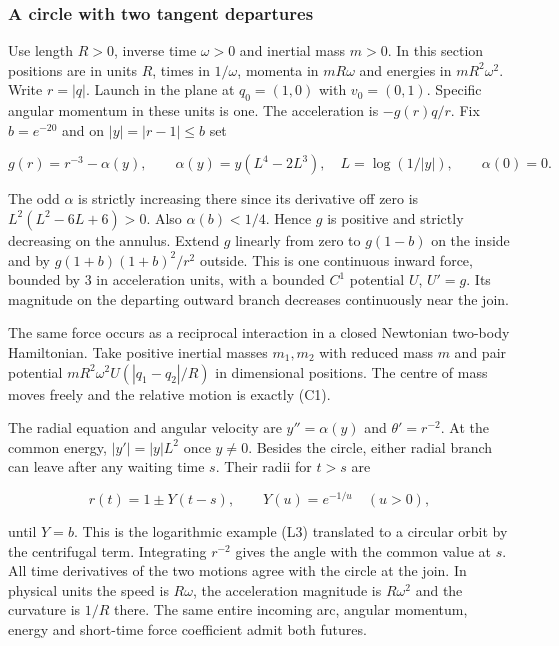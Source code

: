 \documentclass[11pt,a4paper]{article}
\begin{document}
\subsubsection{A circle with two tangent
departures}\label{a-circle-with-two-tangent-departures}

Use length \(R>0\), inverse time \(\omega>0\) and inertial mass \(m>0\).
In this section positions are in units \(R\), times in \(1/\omega\),
momenta in \(mR\omega\) and energies in \(mR^2\omega^2\). Write
\(r=|q|\). Launch in the plane at \(q_0=(1,0)\) with \(v_0=(0,1)\).
Specific angular momentum in these units is one. The acceleration is
\(-g(r)q/r\). Fix \(b=e^{-20}\) and on \(|y|=|r-1|\le b\) set

\[
 g(r)=r^{-3}-\alpha(y),\qquad
 \alpha(y)=y(L^4-2L^3),\quad L=\log(1/|y|),\qquad \alpha(0)=0. \tag{C1}
\]

The odd \(\alpha\) is strictly increasing there since its derivative off
zero is \(L^2(L^2-6L+6)>0\). Also \(\alpha(b)<1/4\). Hence \(g\) is
positive and strictly decreasing on the annulus. Extend \(g\) linearly
from zero to \(g(1-b)\) on the inside and by \(g(1+b)(1+b)^2/r^2\)
outside. This is one continuous inward force, bounded by \(3\) in
acceleration units, with a bounded \(C^1\) potential \(U\), \(U'=g\).
Its magnitude on the departing outward branch decreases continuously
near the join.

The same force occurs as a reciprocal interaction in a closed Newtonian
two-body Hamiltonian. Take positive inertial masses \(m_1,m_2\) with
reduced mass \(m\) and pair potential \(mR^2\omega^2 U(|q_1-q_2|/R)\) in
dimensional positions. The centre of mass moves freely and the relative
motion is exactly (C1).

The radial equation and angular velocity are \(y''=\alpha(y)\) and
\(\theta'=r^{-2}\). At the common energy, \(|y'|=|y|L^2\) once
\(y\ne0\). Besides the circle, either radial branch can leave after any
waiting time \(s\). Their radii for \(t>s\) are

\[
 r(t)=1\pm Y(t-s),\qquad Y(u)=e^{-1/u}\quad(u>0), \tag{C2}
\]

until \(Y=b\). This is the logarithmic example (L3) translated to a
circular orbit by the centrifugal term. Integrating \(r^{-2}\) gives the
angle with the common value at \(s\). All time derivatives of the two
motions agree with the circle at the join. In physical units the speed
is \(R\omega\), the acceleration magnitude is \(R\omega^2\) and the
curvature is \(1/R\) there. The same entire incoming arc, angular
momentum, energy and short-time force coefficient admit both futures.
\end{document}
